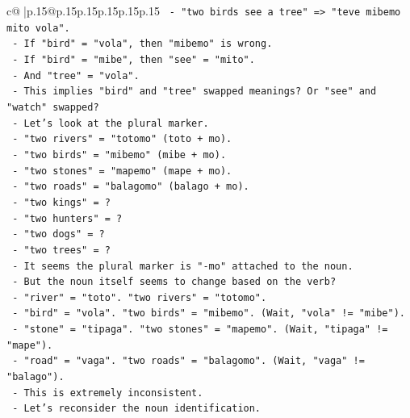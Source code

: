 \documentclass{article}
\begin{document}
{\begin{supertabular}{c@{$\;$}|p{.15\linewidth}@{}p{.15\linewidth}p{.15\linewidth}p{.15\linewidth}p{.15\linewidth}p{.15\linewidth}}
{{{\texttt{                        {-} "two birds see a tree" => "teve mibemo mito vola".} \\
\texttt{                          {-} If "bird" = "vola", then "mibemo" is wrong.} \\
\texttt{                          {-} If "bird" = "mibe", then "see" = "mito".} \\
\texttt{                          {-} And "tree" = "vola".} \\
\texttt{                      {-} This implies "bird" and "tree" swapped meanings? Or "see" and "watch" swapped?} \\
\texttt{                      {-} Let's look at the plural marker.} \\
\texttt{                        {-} "two rivers" = "totomo" (toto + mo).} \\
\texttt{                        {-} "two birds" = "mibemo" (mibe + mo).} \\
\texttt{                        {-} "two stones" = "mapemo" (mape + mo).} \\
\texttt{                        {-} "two roads" = "balagomo" (balago + mo).} \\
\texttt{                        {-} "two kings" = ?} \\
\texttt{                        {-} "two hunters" = ?} \\
\texttt{                        {-} "two dogs" = ?} \\
\texttt{                        {-} "two trees" = ?} \\
\texttt{                      {-} It seems the plural marker is "{-}mo" attached to the noun.} \\
\texttt{                      {-} But the noun itself seems to change based on the verb?} \\
\texttt{                      {-} "river" = "toto". "two rivers" = "totomo".} \\
\texttt{                      {-} "bird" = "vola". "two birds" = "mibemo". (Wait, "vola" != "mibe").} \\
\texttt{                      {-} "stone" = "tipaga". "two stones" = "mapemo". (Wait, "tipaga" != "mape").} \\
\texttt{                      {-} "road" = "vaga". "two roads" = "balagomo". (Wait, "vaga" != "balago").} \\
\texttt{                      {-} This is extremely inconsistent.} \\
\texttt{                      {-} Let's reconsider the noun identification.} \\
}}}
\end{supertabular}}
\end{document}
